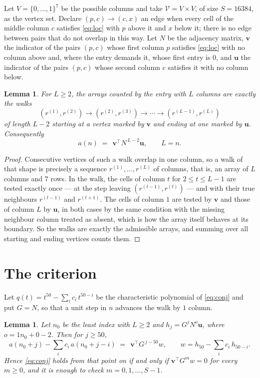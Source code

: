 \documentclass[11pt,a4paper]{article}
\theoremstyle{plain}
\newtheorem{lemma}[theorem]{Lemma}
\theoremstyle{definition}
\begin{document}
Let $V=\{0,\dots,1\}^{7}$ be the possible columns and take
$\mathcal V=V\times V$, of size $S=16384$, as the vertex set. Declare $(p,c)\to(c,x)$ an edge
when every cell of the middle column $c$ satisfies \eqref{eq:loc} with $p$ above it and $x$
below it; there is no edge between pairs that do not overlap in this way. Let $N$ be the
adjacency matrix, $\mathbf{v}$ the indicator of the pairs $(p,c)$ whose first column $p$
satisfies \eqref{eq:loc} with no column above and, where the entry demands it, whose first entry is $0$, and $\mathbf{u}$ the indicator of
the pairs $(p,c)$ whose second column $c$ satisfies it with no column below.

\begin{lemma}\label{lem:walk}
For $L\ge2$, the arrays counted by the entry with $L$ columns are exactly the walks
\[
(r^{(1)},r^{(2)})\to(r^{(2)},r^{(3)})\to\cdots\to(r^{(L-1)},r^{(L)})
\]
of length $L-2$ starting at a vertex marked by $\mathbf{v}$ and ending at one marked by
$\mathbf{u}$. Consequently
\[
a(n)\;=\;\,\mathbf{v}^{\!\top}N^{\,L-2}\mathbf{u},\qquad L=n .
\]
\end{lemma}

\begin{proof}
Consecutive vertices of such a walk overlap in one column, so a walk of that shape is
precisely a sequence $r^{(1)},\dots,r^{(L)}$ of columns, that is, an array of $L$ columns
and $7$ rows. In the walk, the cells of column $t$ for $2\le t\le L-1$ are tested
exactly once --- at the step leaving $(r^{(t-1)},r^{(t)})$ --- and with their true
neighbours $r^{(t-1)}$ and $r^{(t+1)}$. The cells of column $1$ are tested by
$\mathbf{v}$ and those of column $L$ by $\mathbf{u}$, in both cases by the same condition
with the missing neighbour column treated as absent, which is how the array itself behaves at
its boundary. So the walks are exactly the admissible arrays, and summing over all starting
and ending vertices counts them.
\end{proof}

\section{The criterion}

Let $q(t)=t^{50}-\sum_i c_i\,t^{50-i}$ be the characteristic polynomial of
\eqref{eq:conj} and put $G=N$, so that a unit step in $n$ advances the walk by
$1$ column.

\begin{lemma}\label{lem:crit}
Let $n_0$ be the least index with $L\ge2$ and $h_j=G^{j}N^{o}\mathbf{u}$, where
$o=1n_0+0-2$. Then for $j\ge50$,
\[
a(n_0+j)-\sum_i c_i\,a(n_0+j-i)\;=\;\,\mathbf{v}^{\!\top}G^{\,j-50}w,
\qquad w=h_{50}-\sum_i c_i\,h_{50-i} .
\]
Hence \eqref{eq:conj} holds from that point on if and only if
$\mathbf{v}^{\!\top}G^{m}w=0$ for every $m\ge0$, and it is enough to check
$m=0,1,\dots,S-1$.
\end{lemma}
\end{document}
